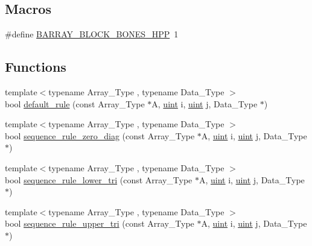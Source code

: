 \subsection*{Macros}
\begin{DoxyCompactItemize}
\item 
\#define \hyperlink{barry_8hpp_a5a519f04c220117f3def1740e0944be7}{B\+A\+R\+R\+A\+Y\+\_\+\+B\+L\+O\+C\+K\+\_\+\+B\+O\+N\+E\+S\+\_\+\+H\+PP}~1
\end{DoxyCompactItemize}
\subsection*{Functions}
\begin{DoxyCompactItemize}
\item 
{\footnotesize template$<$typename Array\+\_\+\+Type , typename Data\+\_\+\+Type $>$ }\\bool \hyperlink{block-bones_8hpp_a4aff3c5c755b16bc4634ab8d8e7fb3f6}{default\+\_\+rule} (const Array\+\_\+\+Type $\ast$A, \hyperlink{typedefs_8hpp_a91ad9478d81a7aaf2593e8d9c3d06a14}{uint} i, \hyperlink{typedefs_8hpp_a91ad9478d81a7aaf2593e8d9c3d06a14}{uint} j, Data\+\_\+\+Type $\ast$)
\item 
{\footnotesize template$<$typename Array\+\_\+\+Type , typename Data\+\_\+\+Type $>$ }\\bool \hyperlink{block-bones_8hpp_a0d46af0e4cb648e744267bc926870c56}{sequence\+\_\+rule\+\_\+zero\+\_\+diag} (const Array\+\_\+\+Type $\ast$A, \hyperlink{typedefs_8hpp_a91ad9478d81a7aaf2593e8d9c3d06a14}{uint} i, \hyperlink{typedefs_8hpp_a91ad9478d81a7aaf2593e8d9c3d06a14}{uint} j, Data\+\_\+\+Type $\ast$)
\item 
{\footnotesize template$<$typename Array\+\_\+\+Type , typename Data\+\_\+\+Type $>$ }\\bool \hyperlink{block-bones_8hpp_a1e0c9474a332f7f0feacb6c83db47e09}{sequence\+\_\+rule\+\_\+lower\+\_\+tri} (const Array\+\_\+\+Type $\ast$A, \hyperlink{typedefs_8hpp_a91ad9478d81a7aaf2593e8d9c3d06a14}{uint} i, \hyperlink{typedefs_8hpp_a91ad9478d81a7aaf2593e8d9c3d06a14}{uint} j, Data\+\_\+\+Type $\ast$)
\item 
{\footnotesize template$<$typename Array\+\_\+\+Type , typename Data\+\_\+\+Type $>$ }\\bool \hyperlink{block-bones_8hpp_af5065fcabecdb2c3eedc5f95389aadfc}{sequence\+\_\+rule\+\_\+upper\+\_\+tri} (const Array\+\_\+\+Type $\ast$A, \hyperlink{typedefs_8hpp_a91ad9478d81a7aaf2593e8d9c3d06a14}{uint} i, \hyperlink{typedefs_8hpp_a91ad9478d81a7aaf2593e8d9c3d06a14}{uint} j, Data\+\_\+\+Type $\ast$)
\end{DoxyCompactItemize}


